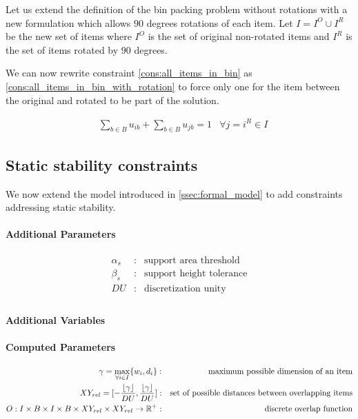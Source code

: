 Let us extend the definition of the bin packing problem without rotations with a new formulation which allows $90$ degrees rotations of each item.
Let $I = I^O \cup I^R$ be the new set of items where $I^O$ is the set of original non-rotated items and $I^R$ is the set of items rotated by $90$ degrees.

We can now rewrite constraint \ref{cons:all_items_in_bin} as \ref{cons:all_items_in_bin_with_rotation} to force only one for the item between the original and rotated to be part of the solution.

\begin{eqnarray}
    & \sum_{b \in B} u_{ib} + \sum_{b \in B} u_{jb} = 1 & \forall j = i^R \in I \label{cons:all_items_in_bin_with_rotation}
\end{eqnarray}

\subsection*{Static stability constraints}

We now extend the model introduced in \cref{ssec:formal_model} to add constraints addressing static stability.

\paragraph*{Additional Parameters}
\begin{eqnarray*}
    \alpha_s  &:& \text{support area threshold} \\
    \beta_s  &:& \text{support height tolerance} \\
    DU      &:& \text{discretization unity} \\
\end{eqnarray*}

\paragraph*{Additional Variables}


\paragraph*{Computed Parameters}
\begin{eqnarray}
    \gamma = \max_{\forall i \in I}\{ w_i, d_i \}  &:& \text{maximum possible dimension of an item} \notag \\
    XY_{rel} =  [ - \frac{\lfloor \gamma \rfloor}{DU}, \frac{\lfloor \gamma \rfloor}{DU}]  &:& \text{set of possible distances between overlapping items} \notag \\
    O : I \times B \times I \times B \times XY_{rel} \times XY_{rel} \rightarrow \mathbb{R}^+ &:& \text{discrete overlap function} \label{eq:overlap_function}
\end{eqnarray}
